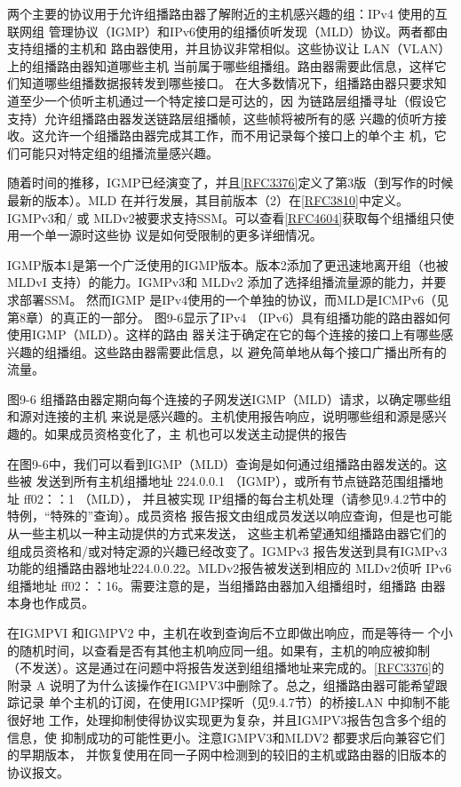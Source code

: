 两个主要的协议用于允许组播路由器了解附近的主机感兴趣的组：IPv4 使用的互联网组
管理协议（IGMP）和IPv6使用的组播侦听发现（MLD）协议。两者都由支持组播的主机和
路由器使用，并且协议非常相似。这些协议让 LAN（VLAN）上的组播路由器知道哪些主机
当前属于哪些组播组。路由器需要此信息，这样它们知道哪些组播数据报转发到哪些接口。
在大多数情况下，组播路由器只要求知道至少一个侦听主机通过一个特定接口是可达的，因
为链路层组播寻址（假设它支持）允许组播路由器发送链路层组播帧，这些帧将被所有的感
兴趣的侦听方接收。这允许一个组播路由器完成其工作，而不用记录每个接口上的单个主
机，它们可能只对特定组的组播流量感兴趣。

随着时间的推移，IGMP已经演变了，并且\href{https://www.rfc-editor.org/rfc/rfc3376}{[RFC3376]}定义了第3版（到写作的时候
最新的版本）。MLD 在并行发展，其目前版本（2）在\href{https://www.rfc-editor.org/rfc/rfc3810}{[RFC3810]}中定义。IGMPv3和/ 或
MLDv2被要求支持SSM。可以查看\href{https://www.rfc-editor.org/rfc/rfc4604}{[RFC4604]}获取每个组播组只使用一个单一源时这些协
议是如何受限制的更多详细情况。

IGMP版本1是第一个广泛使用的IGMP版本。版本2添加了更迅速地离开组（也被
MLDvI 支持）的能力。IGMPv3和 MLDv2 添加了选择组播流量源的能力，并要求部署SSM。
然而IGMP 是IPv4使用的一个单独的协议，而MLD是ICMPv6（见第8章）的真正的一部分。
图9-6显示了IPv4 （IPv6）具有组播功能的路由器如何使用IGMP（MLD）。这样的路由
器关注于确定在它的每个连接的接口上有哪些感兴趣的组播组。这些路由器需要此信息，以
避免简单地从每个接口广播出所有的流量。

图9-6 组播路由器定期向每个连接的子网发送IGMP（MLD）请求，以确定哪些组和源对连接的主机
来说是感兴趣的。主机使用报告响应，说明哪些组和源是感兴趣的。如果成员资格变化了，主
机也可以发送主动提供的报告

在图9-6中，我们可以看到IGMP（MLD）查询是如何通过组播路由器发送的。这些被
发送到所有主机组播地址 224.0.0.1 （IGMP），或所有节点链路范围组播地址 ff02：：1 （MLD），
并且被实现 IP组播的每台主机处理（请参见9.4.2节中的特例，“特殊的”查询）。成员资格
报告报文由组成员发送以响应查询，但是也可能从一些主机以一种主动提供的方式来发送，
这些主机希望通知组播路由器它们的组成员资格和/或对特定源的兴趣已经改变了。IGMPv3
报告发送到具有IGMPv3功能的组播路由器地址224.0.0.22。MLDv2报告被发送到相应的
MLDv2侦听 IPv6 组播地址 ff02：：16。需要注意的是，当组播路由器加入组播组时，组播路
由器本身也作成员。


\begin{tcolorbox}
    在IGMPVI 和IGMPV2 中，主机在收到查询后不立即做出响应，而是等待一
    个小的随机时间，以查看是否有其他主机响应同一组。如果有，主机的响应被抑制
    （不发送）。这是通过在问题中将报告发送到组组播地址来完成的。\href{https://www.rfc-editor.org/rfc/rfc3376}{[RFC3376]}的附录
    A 说明了为什么该操作在IGMPV3中删除了。总之，组播路由器可能希望跟踪记录
    单个主机的订阅，在使用IGMP探听（见9.4.7节）的桥接LAN 中抑制不能很好地
    工作，处理抑制使得协议实现更为复杂，并且IGMPV3报告包含多个组的信息，使
    抑制成功的可能性更小。注意IGMPV3和MLDV2 都要求后向兼容它们的早期版本，
    并恢复使用在同一子网中检测到的较旧的主机或路由器的旧版本的协议报文。
\end{tcolorbox}


